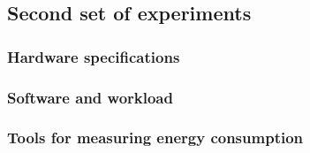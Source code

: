 \subsection{Second set of experiments}

\subsubsection*{Hardware specifications}
\subsubsection*{Software and workload}
\subsubsection*{Tools for measuring energy consumption}



